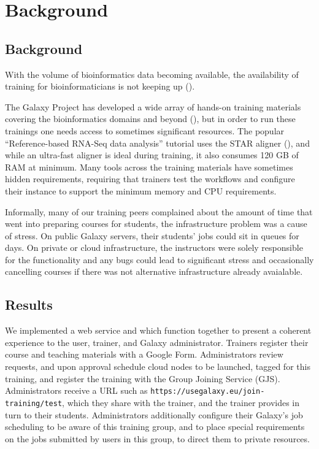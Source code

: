 \documentclass[a4paper,num-refs]{oup-contemporary}
\begin{document}
\section{Background}
\label{sec:background}


\subsection{Background}
With the volume of bioinformatics data becoming available, the availability of training for bioinformaticians is not keeping up (\cite{Attwood2017}).

The Galaxy Project has developed a wide array of hands-on training materials covering the bioinformatics domains and beyond (\cite{gtn}), but in order to run these trainings one needs access to sometimes significant resources. The popular ``Reference-based RNA-Seq data analysis'' tutorial uses the STAR aligner (\cite{Dobin2012}), and while an ultra-fast aligner is ideal during training, it also consumes 120 GB of RAM at minimum. Many tools across the training materials have sometimes hidden requirements, requiring that trainers test the workflows and configure their instance to support the minimum memory and CPU requirements.

Informally, many of our training peers complained about the amount of time that went into preparing courses for students, the infrastructure problem was a cause of stress. On public Galaxy servers, their students' jobs could sit in queues for days. On private or cloud infrastructure, the instructors were solely responsible for the functionality and any bugs could lead to significant stress and occasionally cancelling courses if there was not alternative infrastructure already avaialable.


\subsection{Results}
We implemented a web service and which function together to present a coherent experience to the user, trainer, and Galaxy administrator. Trainers register their course and teaching materials with a Google Form. Administrators review requests, and upon approval schedule cloud nodes to be launched, tagged for this training, and register the training with the Group Joining Service (GJS). Administrators receive a URL such as \texttt{https://usegalaxy.eu/join-training/test}, which they share with the trainer, and the trainer provides in turn to their students. Administrators additionally configure their Galaxy's job scheduling to be aware of this training group, and to place special requirements on the jobs submitted by users in this group, to direct them to private resources.
\end{document}

